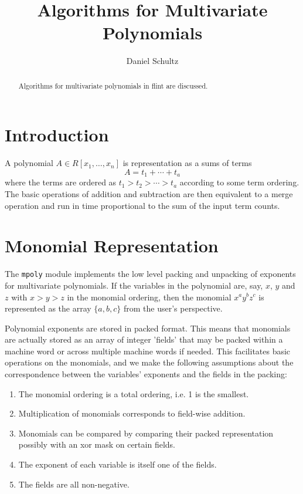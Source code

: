 \documentclass[11pt,reqno]{amsart}
\title{Algorithms for Multivariate Polynomials}
\author{Daniel Schultz}
\numberwithin{equation}{section}
\begin{document}
\begin{abstract}
Algorithms for multivariate polynomials in flint are discussed.
\end{abstract}


\maketitle

\section{Introduction}

A polynomial $A \in R[x_1,\dots,x_n]$ is representation as a sums of terms
\begin{equation*}
A = t_1 + \cdots + t_a
\end{equation*}
where the terms are ordered as $t_1 > t_2 > \cdots > t_a$ according to some 
term ordering. 
The basic operations of addition and subtraction are then equivalent to a merge 
operation and run in time proportional to the sum of the input term counts.


\section{Monomial Representation}

The {\tt mpoly} module implements the low level packing and unpacking of 
exponents
for multivariate polynomials. If the variables in the polynomial are, say,
$x$, $y$ and $z$ with $x > y > z$ in the monomial ordering, then the monomial
$x^a y^b z^c$ is represented as the array $\{a, b, c\}$ from the user's 
perspective.

Polynomial exponents are stored in packed format. This means that monomials are
actually stored as an array of integer 'fields' that may be packed within
a machine word or across multiple machine words if needed.
This facilitates basic operations on the monomials, and we make the following 
assumptions about the correspondence between the variables' exponents and the
fields in the packing:

\begin{enumerate}
\item {The monomial ordering is a total ordering, i.e. 1 is the smallest.}
\item{Multiplication of monomials corresponds to field-wise addition.}
\item{Monomials can be compared by comparing their packed representation possibly with an xor mask on certain fields.}
\item{The exponent of each variable is itself one of the fields.}
\item{The fields are all non-negative.}
\end{enumerate}
\end{document}
